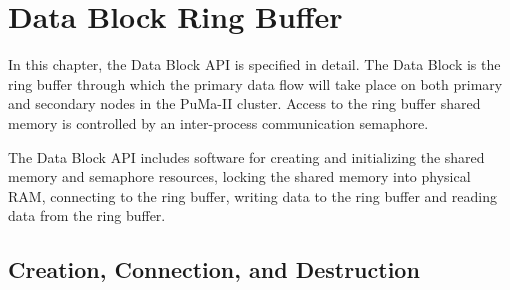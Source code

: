 \chapter{Data Block Ring Buffer}

In this chapter, the Data Block API is specified in detail.  The Data
Block is the ring buffer through which the primary data flow will take
place on both primary and secondary nodes in the PuMa-II cluster.
Access to the ring buffer shared memory is controlled by an
inter-process communication semaphore.

The Data Block API includes software for creating and initializing the
shared memory and semaphore resources, locking the shared memory into
physical RAM, connecting to the ring buffer, writing data to the ring
buffer and reading data from the ring buffer.

\section{Creation, Connection, and Destruction}

